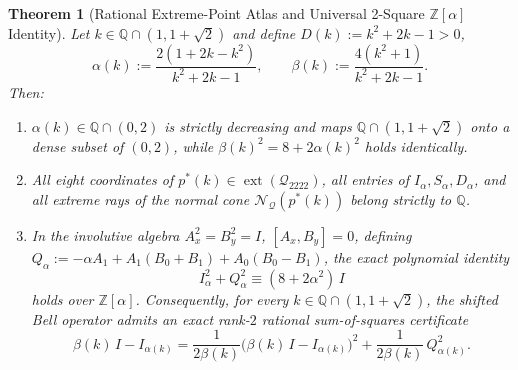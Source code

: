 \documentclass[11pt,a4paper]{article}
\newtheorem{theorem}{Theorem}[section]
\newcommand{\QQ}{\mathbb{Q}}
\newcommand{\ZZ}{\mathbb{Z}}
\newcommand{\calQ}{\mathcal{Q}_{2222}}
\newcommand{\calN}{\mathcal{N}_{\mathcal{Q}}}
\newcommand{\ext}{\operatorname{ext}}
\begin{document}
\begin{theorem}[Rational Extreme-Point Atlas and Universal 2-Square {$\ZZ[\alpha]$} Identity]
\label{thm:rational-2sq}
Let $k \in \QQ \cap (1, 1 + \sqrt{2})$ and define $D(k) := k^2 + 2k - 1 > 0$,
\begin{equation}
  \alpha(k) := \frac{2(1 + 2k - k^2)}{k^2 + 2k - 1}, \qquad \beta(k) := \frac{4(k^2 + 1)}{k^2 + 2k - 1}.
  \label{eq:rational-param}
\end{equation}
Then:
\begin{enumerate}[leftmargin=1.8em,itemsep=2pt]
  \item $\alpha(k) \in \QQ \cap (0,2)$ is strictly decreasing and maps $\QQ \cap (1, 1+\sqrt{2})$ onto a dense subset of $(0,2)$, while $\beta(k)^2 = 8 + 2\alpha(k)^2$ holds identically.
  \item All eight coordinates of $p^*(k) \in \ext(\calQ)$, all entries of $I_\alpha, S_\alpha, D_\alpha$, and all extreme rays of the normal cone $\calN(p^*(k))$ belong strictly to $\QQ$.
  \item In the involutive algebra $A_x^2 = B_y^2 = I$, $[A_x, B_y] = 0$, defining $Q_\alpha := -\alpha A_1 + A_1(B_0 + B_1) + A_0(B_0 - B_1)$, the exact polynomial identity
  \begin{equation}
    I_\alpha^2 + Q_\alpha^2 \equiv (8 + 2\alpha^2)\, I
    \label{eq:two-square-id}
  \end{equation}
  holds over $\ZZ[\alpha]$. Consequently, for every $k \in \QQ \cap (1, 1+\sqrt{2})$, the shifted Bell operator admits an exact rank-$2$ rational sum-of-squares certificate
  \begin{equation}
    \beta(k)\, I - I_{\alpha(k)} = \frac{1}{2\beta(k)}\bigl(\beta(k)\, I - I_{\alpha(k)}\bigr)^2 + \frac{1}{2\beta(k)}\, Q_{\alpha(k)}^2.
    \label{eq:two-square-sos}
  \end{equation}
\end{enumerate}
\end{theorem}
\end{document}
